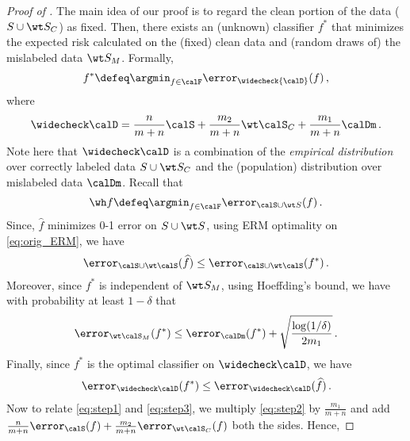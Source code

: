 \begin{proof}[Proof of ] 
    The main idea of our proof is to regard 
    the clean portion of the data 
    ($S \cup \wt S_C$) as fixed.   
    Then, there exists an (unknown) classifier $f^*$ 
    that minimizes the expected risk
    calculated on the (fixed) clean data
    and (random draws of) the mislabeled data $\wt S_M$. 
    Formally, 
    \begin{align}
    f^* \defeq \argmin_{f \in \calF} \error_{\widecheck {\calD}} (f) \,, \label{eq:modified_ERM}
    \end{align}
    where $$\widecheck \calD = \frac{n}{m+n} \calS + \frac{m_2}{m+n} \wt \calS_C  + \frac{m_1}{m+n}\calDm \,.$$ 
    Note here that $\widecheck \calD$ is a combination 
    of the \emph{empirical distribution} 
    over correctly labeled data $S \cup \wt S_C$
    and the (population) distribution 
    over mislabeled data $\calDm$.
    Recall that 
    \begin{align}
    \wh f \defeq \argmin_{f \in \calF} \error_{\calS \cup \wt S} (f) \,. \label{eq:orig_ERM}
    \end{align}
    Since, $\widehat f$ minimizes 0-1 error 
    on $S \cup \wt S$, using ERM optimality on \eqref{eq:orig_ERM},  
    we have 
    \begin{align}
        \error_{\calS \cup \wt \calS}(\widehat f) \le \error_{
            \calS \cup \wt \calS}(f^*) \,.    \label{eq:step1}
    \end{align}
    Moreover, since $f^*$ is independent of $\wt S_M$, using Hoeffding's bound,
    we have with probability at least $1-\delta$ that
    \begin{align}
      \error_{\wt \calS_M}(f^*) \le \error_{ \calDm}(f^*) +  \sqrt{\frac{\log(1/\delta)}{2 m_1}} \,. \label{eq:step2} 
    \end{align}
    Finally, since $f^*$ is the optimal classifier on $\widecheck \calD$, 
    we have 
    \begin{align}
        \error_{\widecheck \calD}(f^*) \le \error_{\widecheck \calD}(\widehat f) \,. \label{eq:step3}
    \end{align}
    Now to relate \eqref{eq:step1} and \eqref{eq:step3}, we multiply \eqref{eq:step2} by $\frac{m_1}{m+n}$ and add $\frac{n}{m+n} \error_{\calS} (f)  + \frac{m_2}{m+n} \error_{\wt \calS_C} (f)$ both the sides. Hence, 

\end{proof}
